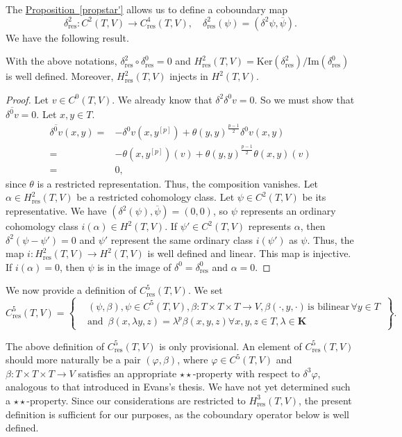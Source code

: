 \documentclass[11pt, twoside]{article}
\begin{document}
The \hyperref[propstar']{Proposition~\ref*{propstar'}} allows us to define a coboundary map $$\delta^2_\mathrm{res}:C^2(T,V)\to C^4_\mathrm{res}(T,V), \,\,\,\,\,\, \delta^2_\mathrm{res}(\psi)=(\delta^2\psi, \overline{\psi}). $$ We have the following result.

\begin{thm}
With the above notations, $\delta^2_\mathrm{res}\circ\delta^0_\mathrm{res}=0 $ and $H^2_\mathrm{res}(T,V)= \mathrm{Ker}(\delta^2_\mathrm{res})/\mathrm{Im}(\delta^0_\mathrm{res}) $ is well defined. Moreover, $H^2_\mathrm{res}(T,V) $ injects in $H^2(T,V)$.
\end{thm}

\begin{proof}
    Let $v\in C^0(T,V) $. We already know that $\delta^2\delta^0v=0 $. So we must show that $\overline{\delta^0v}=0 $. Let $x,y\in T$. \begin{align*}
        \overline{\delta^0v}(x,y)=& -\delta^0 v(x,y^{[p]})+ \theta(y,y)^\frac{p-1}{2}\delta^0v(x,y) \\ =& -\theta(x,y^{[p]})(v)+ \theta(y,y)^\frac{p-1}{2}\theta(x,y)(v)\\ =& 0,
    \end{align*} since $\theta$ is a restricted representation. Thus, the composition vanishes. Let $\alpha\in H_\mathrm{res}^2(T,V) $ be a restricted cohomology class. Let $\psi\in C^2(T,V) $ be its representative. We have $(\delta^2(\psi),\overline{\psi})=(0,0) $, so $\psi$ represents an ordinary cohomology class $i(\alpha)\in H^2(T,V) $. If $\psi'\in C^2(T,V)$ represents $\alpha$, then $\delta^{2}(\psi-\psi')=0 $ and $\psi' $ represent the same ordinary class $i(\psi') $ as $\psi$. Thus, the map $i:H_\mathrm{res}^2(T,V)\to H^2(T,V) $ is well defined and linear. This map is injective. If $i(\alpha)=0 $, then $\psi$ is in the image of $\delta^{0}=\delta_\mathrm{res}^{0} $ and $\alpha=0$.
\end{proof}


We now provide a definition of $C^5_\mathrm{res}(T,V)$. We set \[C^5_\mathrm{res}(T,V)= \left\{\begin{aligned}
    &(\psi,\beta), \psi\in C^5(T,V), \beta: T\times T\times T\to V,\beta(\cdot,y,\cdot)\, \text{is bilinear}\, \forall y\in T\, \\ &\text{and  } \, \beta(x,\lambda y,z)=\lambda^p\beta(x,y,z) \forall x,y,z\in T,\lambda\in \mathbf{K}
\end{aligned}
    \right\}.\] 

\begin{rmq}
The above definition of $ C_\mathrm{res}^5(T,V) $ is only provisional. An element of $C_\mathrm{res}^5 (T,V)$ should more naturally be a pair $(\varphi,\beta) $, where $\varphi\in C^5(T,V)$ and $\beta:T\times T\times T\to V $ satisfies an appropriate $\star\star $-property with respect to $\delta^3\varphi$, analogous to that introduced in Evans's thesis. We have not yet determined such a $\star\star $-property. Since our considerations are restricted to $H^3_\mathrm{res}(T,V)$, the present definition is sufficient for our purposes, as the coboundary operator below is well defined.      
\end{rmq}
\end{document}
